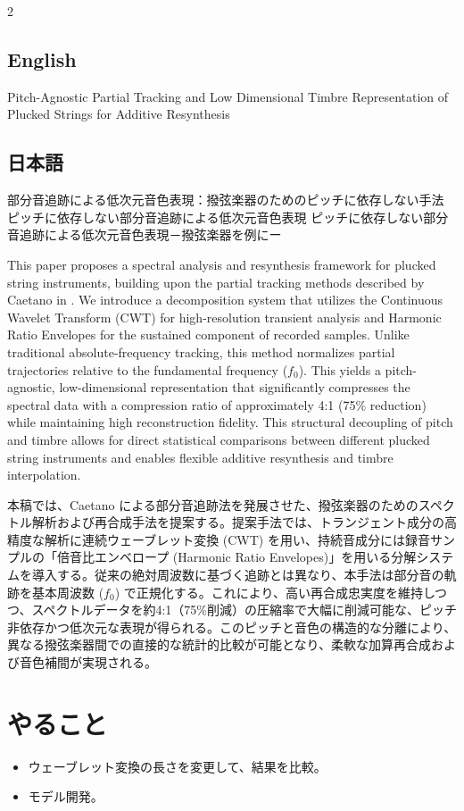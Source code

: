 \documentclass[a4paper, 11pt]{article}
\begin{document}
\begin{paracol}{2}
    \subsection*{English}
    Pitch-Agnostic Partial Tracking and Low Dimensional Timbre Representation of Plucked Strings for Additive Resynthesis
    \switchcolumn

    \subsection*{日本語}
    部分音追跡による低次元音色表現：撥弦楽器のためのピッチに依存しない手法
    ピッチに依存しない部分音追跡による低次元音色表現
    ピッチに依存しない部分音追跡による低次元音色表現－撥弦楽器を例にー
    \switchcolumn*

    This paper proposes a spectral analysis and resynthesis framework for plucked string instruments, building upon the partial tracking methods described by Caetano in \cite{soundMorphingCaetano}. We introduce a decomposition system that utilizes the Continuous Wavelet Transform (CWT) for high-resolution transient analysis and Harmonic Ratio Envelopes for the sustained component of recorded samples. Unlike traditional absolute-frequency tracking, this method normalizes partial trajectories relative to the fundamental frequency ($f_0$). This yields a pitch-agnostic, low-dimensional representation that significantly compresses the spectral data with a compression ratio of approximately 4:1 (75\% reduction) while maintaining high reconstruction fidelity. This structural decoupling of pitch and timbre allows for direct statistical comparisons between different plucked string instruments and enables flexible additive resynthesis and timbre interpolation.
    \switchcolumn

    本稿では、Caetano \cite{soundMorphingCaetano} による部分音追跡法を発展させた、撥弦楽器のためのスペクトル解析および再合成手法を提案する。提案手法では、トランジェント成分の高精度な解析に連続ウェーブレット変換 (CWT) を用い、持続音成分には録音サンプルの「倍音比エンベロープ (Harmonic Ratio Envelopes)」を用いる分解システムを導入する。従来の絶対周波数に基づく追跡とは異なり、本手法は部分音の軌跡を基本周波数 ($f_0$) で正規化する。これにより、高い再合成忠実度を維持しつつ、スペクトルデータを約4:1（75\%削減）の圧縮率で大幅に削減可能な、ピッチ非依存かつ低次元な表現が得られる。このピッチと音色の構造的な分離により、異なる撥弦楽器間での直接的な統計的比較が可能となり、柔軟な加算再合成および音色補間が実現される。
    \switchcolumn*

\end{paracol}

\section*{やること}
\begin{itemize}
    \item ウェーブレット変換の長さを変更して、結果を比較。
    \item モデル開発。
\end{itemize}


\printbibliography
\end{document}
